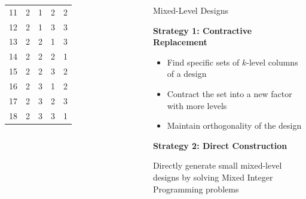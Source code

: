 \documentclass[10pt, compress, aspectratio=169, xcolor={table,usenames,dvipsnames}]{beamer}
\begin{document}
\begin{frame}
\begin{columns}[c]
\begin{table}[]
\begin{tabular}{@{}ccccc@{}}
                    \cellcolor{gray!18}11 & \cellcolor{cyan!25}2 & \cellcolor{green!25}1 & \cellcolor{cyan!25}2 & \cellcolor{cyan!25}2 \\
                    \cellcolor{gray!18}12 & \cellcolor{cyan!25}2 & \cellcolor{green!25}1 & \cellcolor{red!25}3 & \cellcolor{red!25}3 \\
                    \cellcolor{gray!18}13 & \cellcolor{cyan!25}2 & \cellcolor{cyan!25}2 & \cellcolor{green!25}1 & \cellcolor{red!25}3 \\
                    \cellcolor{gray!18}14 & \cellcolor{cyan!25}2 & \cellcolor{cyan!25}2 & \cellcolor{cyan!25}2 & \cellcolor{green!25}1 \\
                    \cellcolor{gray!18}15 & \cellcolor{cyan!25}2 & \cellcolor{cyan!25}2 & \cellcolor{red!25}3 & \cellcolor{cyan!25}2 \\
                    \cellcolor{gray!18}16 & \cellcolor{cyan!25}2 & \cellcolor{red!25}3 & \cellcolor{green!25}1 & \cellcolor{cyan!25}2 \\
                    \cellcolor{gray!18}17 & \cellcolor{cyan!25}2 & \cellcolor{red!25}3 & \cellcolor{cyan!25}2 & \cellcolor{red!25}3 \\
                    \cellcolor{gray!18}18 & \cellcolor{cyan!25}2 & \cellcolor{red!25}3 & \cellcolor{red!25}3 & \cellcolor{green!25}1 \\ \bottomrule
                \end{tabular}
            \end{table}


            \begin{block}{Mixed-Level Designs}

                \vspace{.2cm}

                \textbf{Strategy 1: \alert{Contractive Replacement}}

                \begin{itemize}
                    \item Find \alert{specific sets of $k$-level columns} of a
                        design
                    \item \alert{Contract} the set into a new \alert{factor
                        with more levels}
                    \item \alert{Maintain orthogonality} of the design
                \end{itemize}

                \textbf{Strategy 2: \alert{Direct Construction}}

                Directly generate \alert{small mixed-level designs} by
                solving \alert{Mixed Integer Programming problems}
            \end{block}

    \end{columns}
\end{frame}
\end{document}
